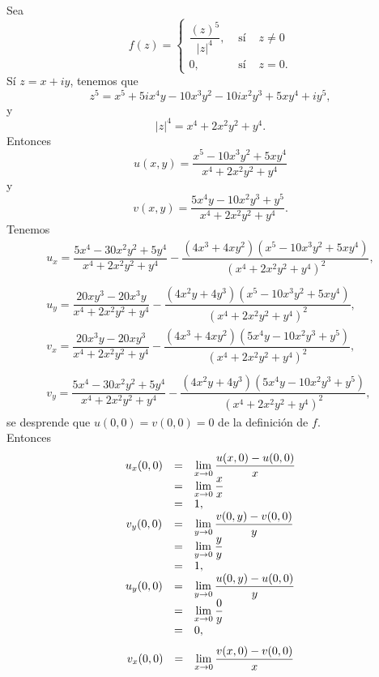 \begin{Ejem}
	Sea 
	\[
		f(z)= \left\{\begin{array}{ccl}
			\dfrac{(z)^5}{|z|^4}, &\mbox{ sí }& z\neq 0\\
			0,&\mbox{ sí }&z=0.
		\end{array} \right. 
		\] 
	 Sí $z=x+iy$, tenemos que $$z^5=x^5+5ix^4y-10x^3y^2-10ix^2y^3+5xy^4+iy^5,$$ y $$|z|^4=x^4+2 x^2 y^2+y^4.$$
	 Entonces $$u(x,y)=\dfrac{x^5 - 10 x^3 y^2  + 5 x y^4 }{x^4 + 2 x^2 y^2 + y^4}$$ y $$v(x,y)=\dfrac{ 5  x^4 y  - 10  x^2 y^3 +  y^5}{x^4 + 2 x^2 y^2 + y^4}.$$
	 Tenemos
	\[
		\begin{array}{c}
			u_x=\dfrac{5 x^4-30 x^2 y^2+5 y^4}{x^4+2 x^2 y^2+y^4}-\dfrac{\left(4 x^3+4 x y^2\right) \left(x^5-10 x^3 y^2+5 x y^4\right)}{\left(x^4+2 x^2 y^2+y^4\right)^2},\\\\
			u_y = \dfrac{20 x y^3-20 x^3 y}{x^4+2 x^2 y^2+y^4}-\dfrac{\left(4 x^2 y+4 y^3\right) \left(x^5-10 x^3 y^2+5 x y^4\right)}{\left(x^4+2 x^2 y^2+y^4\right)^2},\\
			v_x=\dfrac{20 x^3 y-20 x y^3}{x^4+2 x^2 y^2+y^4}-\dfrac{\left(4 x^3+4 x y^2\right) \left(5 x^4 y-10 x^2 y^3+y^5\right)}{\left(x^4+2 x^2 y^2+y^4\right)^2},\\\\
			v_y=\dfrac{5 x^4-30 x^2 y^2+5 y^4}{x^4+2 x^2 y^2+y^4}-\dfrac{\left(4 x^2 y+4 y^3\right) \left(5 x^4 y-10 x^2 y^3+y^5\right)}{\left(x^4+2 x^2 y^2+y^4\right)^2},
		\end{array}
	\]se desprende que $u(0,0)=v(0,0)=0$ de la definición de $f$.\\
	Entonces 
	\[
		\begin{array}{ccl}
			u_x(0,0)&=&\displaystyle\lim_{x\rightarrow 0}\dfrac{u(x,0)-u(0,0)}{x}\\
			&=&\displaystyle\lim_{x\rightarrow 0}\dfrac{x}{x}\\
			&=&1,\\
			v_y(0,0)&=&\displaystyle\lim_{y\rightarrow 0}\dfrac{v(0,y)-v(0,0)}{y}\\
			&=&\displaystyle\lim_{y\rightarrow 0}\dfrac{y}{y}\\
			&=&1,\\
			u_y(0,0)&=&\displaystyle\lim_{y\rightarrow 0}\dfrac{u(0,y)-u(0,0)}{y}\\
			&=&\displaystyle\lim_{x\rightarrow 0}\dfrac{0}{y}\\
			&=&0,\\
		\end{array}
		\]
		\[
		\begin{array}{ccl}
			v_x(0,0)&=&\displaystyle\lim_{x\rightarrow 0}\dfrac{v(x,0)-v(0,0)}{x}\\

\end{array}\]
\end{Ejem}
